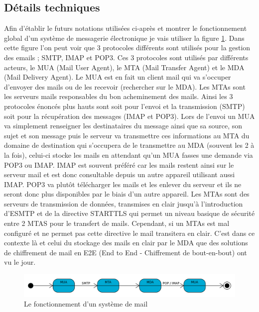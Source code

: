 \subsection{Détails techniques}
Afin d'établir le futurs notations utilisées ci-après et montrer le fonctionnement global d'un système de messagerie électronique je vais utiliser la figure \ref{fig:mailGlobal}. Dans cette figure l'on peut voir que 3 protocoles différents sont utilisés pour la gestion des emails ; SMTP, IMAP et POP3. Ces 3 protocoles sont utilisés par différents acteurs, le MUA (Mail User Agent), le MTA (Mail Transfer Agent) et le MDA (Mail Delivery Agent). Le MUA est en fait un client mail qui va s'occuper d'envoyer des mails ou de les recevoir (rechercher sur le MDA). Les MTAs sont les serveurs mails responsables du bon acheminement des mails. Ainsi les 3 protocoles énoncés plus hauts sont soit pour l'envoi et la transmission (SMTP) soit pour la récupération des messages (IMAP et POP3). Lors de l'envoi un MUA va simplement renseigner les destinataires du message ainsi que sa source, son sujet et son message puis le serveur va transmettre ces informations au MTA du domaine de destination qui s'occupera de le transmettre au MDA (souvent les 2 à la fois), celui-ci stocke les mails en attendant qu'un MUA fasses une demande via POP3 ou IMAP. IMAP est souvent préféré car les mails restent ainsi sur le serveur mail et est donc consultable depuis un autre appareil utilisant aussi IMAP. POP3 va plutôt télécharger les mails et les enlever du serveur et ils ne seront donc plus disponibles par le biais d'un autre appareil. Les MTAs sont des serveurs de transmission de données, transmises en clair jusqu'à l'introduction d'ESMTP et de la directive STARTTLS qui permet un niveau basique de sécurité entre 2 MTAS pour le transfert de mails. Cependant, si un MTAs est mal configuré et ne permet pas cette directive le mail transitera en clair. C'est dans ce contexte là et celui du stockage des mails en clair par le MDA que des solutions de chiffrement de mail en E2E (End to End - Chiffrement de bout-en-bout) ont vu le jour.
\begin{figure}[h!]
	\includegraphics[width=14cm]{images/Etapes_envoi_email.png}
	\centering
	\caption{Le fonctionnement d'un système de mail~\cite{wiki:mailGlobal}}
	\label{fig:mailGlobal}
\end{figure}
